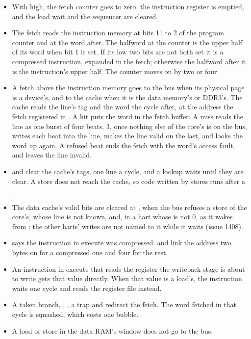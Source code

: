 \begin{itemize}
\item With  high, the fetch counter goes to zero, the
instruction register is emptied, and the load wait and the sequencer
are cleared.
\item The fetch reads the instruction memory at bits 11 to 2 of the
program counter and at the word after. The halfword at the counter is
the upper half of its word when bit 1 is set. If its low two bits are
not both set it is a compressed instruction, expanded in the fetch;
otherwise the halfword after it is the instruction's upper half. The
counter moves on by two or four.
\item A fetch above the instruction memory goes to the bus when its
physical page is a device's, and to the cache when it is the data
memory's or DDR3's. The cache reads the line's tag and the word the
cycle after, at the address the fetch registered in . A
hit puts the word in the fetch buffer. A miss reads the line as one
burst of four beats,  3, once nothing else of the core's is
on the bus, writes each beat into the line, makes the line valid on the
last, and looks the word up again. A refused beat ends the fetch with
the word's access fault, and leaves the line invalid.
\item {} and  clear the cache's tags, one line a
cycle, and a lookup waits until they are clear. A store does not reach
the cache, so code written by stores runs after a .
\item The data cache's valid bits are cleared at , when the bus
refuses a store of the core's, whose line is not known, and, in a hart
whose  is not 0, as it wakes from : the other
harts' writes are not named to it while it waits (issue 1408).
\item {} says the instruction in execute was compressed.
 and  link the address two bytes on for a
compressed one and four for the rest.
\item An instruction in execute that reads the register the writeback
stage is about to write gets that value directly. When that value is a
load's, the instruction waits one cycle and reads the register file
instead.
\item A taken branch, , , a trap and 
redirect the fetch. The word fetched in that cycle is squashed, which
costs one bubble.
\item A load or store in the data RAM's window does not go to the bus.

\end{itemize}
